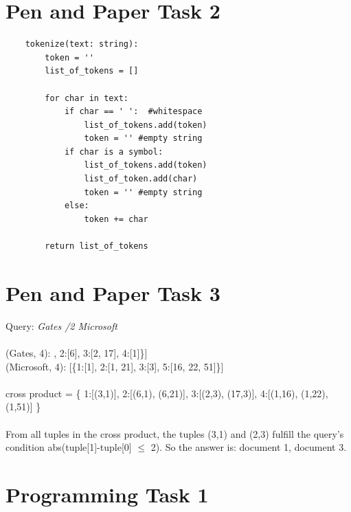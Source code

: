 \documentclass[a4paper]{scrartcl}
\begin{document}
\clearpage
\section*{Pen and Paper Task 2}
\begin{lstlisting}
    tokenize(text: string):
        token = ''
        list_of_tokens = []

        for char in text:
            if char == ' ':  #whitespace
                list_of_tokens.add(token)
                token = '' #empty string
            if char is a symbol:
                list_of_tokens.add(token)
                list_of_token.add(char)
                token = '' #empty string
            else:
                token += char
                
        return list_of_tokens

\end{lstlisting}

\clearpage
\section*{Pen and Paper Task 3}
Query: \textit{Gates /2 Microsoft}\\
\\
(Gates, 4): \quad \; [\{1:[3], 2:[6], 3:[2, 17], 4:[1]\}]\\
(Microsoft, 4): [\{1:[1], 2:[1, 21], 3:[3], 5:[16, 22, 51]\}]\\
\\
cross product = \{
  1:[(3,1)],
  2:[(6,1), (6,21)],
  3:[(2,3), (17,3)],
  4:[(1,16), (1,22), (1,51)]
\}\\
\\
From all tuples in the cross product, the tuples (3,1) and (2,3) fulfill the query's condition abs(tuple[1]-tuple[0] $\leq$ 2). So the answer is: document 1, document 3.\\


\clearpage
\section*{Programming Task 1}

\end{document}

